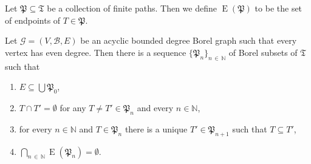\documentclass[AHL,Unicode,longabstracts,published]{cedram}
\DeclareMathOperator{\E}{\mathrm{E}}
\newcommand{\clG}{\mathcal{G}}
\newcommand{\clB}{\mathcal{B}}
\newcommand{\bbZ}{\mathbb{N}}
\newcommand{\frkP}{\mathfrak{P}}
\newcommand{\frkT}{\mathfrak{T}}
\newcommand{\clG}{\mathcal{G}}
\begin{document}
Let $\frkP\subseteq \frkT$ be a collection of finite paths. Then we define $\E(\frkP)$ to be the set of endpoints of $T\in \frkP$.


\begin{prop}\label{pr:paths}
Let $\clG=(V,\clB,E)$ be an acyclic bounded degree Borel graph such that every vertex has even degree. Then there is a sequence $\{\frkP_n\}_{n\,\in\,\bbZ}$ of Borel subsets of $\frkT$ such that
\begin{enumerate}
\item\label{prop4.2.1} $E\subseteq \bigcup\frkP_0$,
\item\label{prop4.2.2} $T\cap T'=\emptyset$ for any $T\not=T'\in \frkP_n$ and every $n\in \bbZ$,
\item\label{prop4.2.3} for every $n\in \bbZ$ and $T\in \frkP_n$ there is a unique $T'\in \frkP_{n+1}$ such that $T\subseteq T'$,
\item\label{prop4.2.4} $\bigcap_{n\,\in\,\bbZ} \E(\frkP_n)=\emptyset$.
\end{enumerate}
\end{prop}
\end{document}
